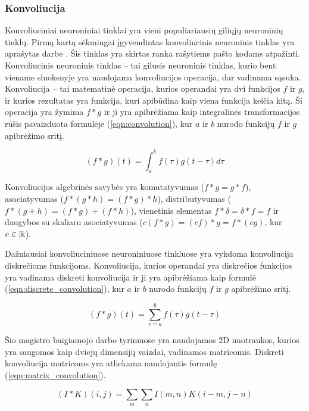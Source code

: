 \subsubsection{Konvoliucija}

Konvoliuciniai neuroniniai tinklai yra vieni populiariausių giliųjų neuroninių tinklų. Pirmą kartą sėkmingai įgyvendintas konvoliucinis neuroninis tinklas yra aprašytas darbe \cite{cnn}. Šis tinklas yra skirtas ranka rašytiems pašto kodams atpažinti. Konvoliucinis neuroninis tinklas -- tai gilusis neuroninis tinklas, kurio bent viename sluoksnyje yra naudojama konvoliucijos operacija, dar vadinama sąsuka. Konvoliucija -- tai matematinė operacija, kurios operandai yra dvi funkcijos $f$ ir $g$, ir kurios rezultatas yra funkcija, kuri apibūdina kaip viena funkcija keičia kitą. Ši operacija yra žymima $f * g$ ir ji yra apibrėžiama kaip integralinės transformacijos rūšis pavaizduota formulėje (\ref{eqn:convolution}), kur $a$ ir $b$ nurodo funkcijų  $f$ ir $g$ apibrėžimo sritį.

\begin{equation}
\label{eqn:convolution}
	(f * g)(t) = \int_{a}^{b} f(\tau)g(t - \tau) d\tau
\end{equation}

Konvoliucijos algebrinės savybės yra komutatyvumas ($f * g = g * f$), asociatyvumas ($f * (g * h) = (f * g) * h$), distributyvumas ($f * (g + h) = (f * g) + (f * h)$), vienetinis elementas $f * \delta = \delta * f = f$ ir daugybos su skaliaru asociatyvumas ($c(f * g) = (cf) * g = f * (cg)$, kur $c \in \mathbb{R}$).

Dažniausiai konvoliuciniuose neuroniniuose tinkluose yra vykdoma konvoliucija diskrečioms funkcijoms. Konvoliucija, kurios operandai yra diskrečios funkcijos yra vadinama diskreti konvoliucija ir ji yra apibrėžiama kaip formulė (\ref{eqn:discrete_convolution}), kur $a$ ir $b$ nurodo funkcijų  $f$ ir $g$ apibrėžimo sritį.

\begin{equation}
\label{eqn:discrete_convolution}
	(f * g)(t) = \sum_{\tau = a}^{b} f(\tau)g(t - \tau)
\end{equation}

Šio magistro baigiamojo darbo tyrimuose yra naudojamos 2D nuotraukos, kurios yra saugomos kaip dviejų dimensijų vaizdai, vadinamos matricomis. Diskreti konvoliucija matricoms yra atliekama naudojantis formulę (\ref{eqn:matrix_convolution}).

\begin{equation}
\label{eqn:matrix_convolution}
	(I * K)(i, j) = \sum_{m} \sum_{n} I(m, n) K(i - m, j - n)
\end{equation}


